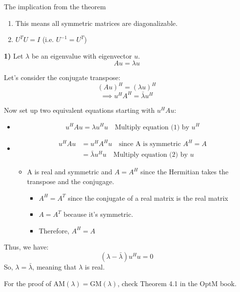 \begin{warning}
    The implication from the theorem
    \begin{enumerate}
        \item This means all symmetric matrices are diagonalizable. 
        \item $U^T U = I$ (i.e. $U^{-1} = U^T$)
    \end{enumerate}
\end{warning}

\begin{derivation}
        \textbf{1)} Let $\lambda$ be an eigenvalue with eigenvector $u$.
        \[
        A u = \lambda u \tag{1}
        \]
        
        Let's consider the conjugate transpose:
        \[
        (A u)^H = (\lambda u)^H
        \]
        \[
        \implies u^H A^H = \bar{\lambda} u^H \tag{2}
        \]
        \vspace{1em}

        Now set up two equivalent equations starting with $u^H A u$:
        
        \begin{itemize}
            \item
            \[
            u^H A u = \lambda u^H u \quad \text{Multiply equation (1) by $u^H$}
            \]
            \item 
            \begin{align*}
                u^H A u &= u^H A^H u \quad \text{since A is symmetric } A^H = A\\
                &= \bar{\lambda} u^H u \quad \text{Multiply equation (2) by $u$}
            \end{align*}
            \begin{itemize}
                \item A is real and symmetric and $A = A^H$ since the Hermitian takes the transpose and the conjugage. 
                \begin{itemize}
                    \item $A^H = A^T$ since the conjugate of a real matrix is the real matrix 
                    \item $A=A^T$ because it's symmetric. 
                    \item Therefore, $A^H = A$
                \end{itemize}
            \end{itemize}
        \end{itemize}
        \vspace{1em}

        Thus, we have:
        \[
        (\lambda - \bar{\lambda}) u^H u = 0
        \]
        So, $\lambda = \bar{\lambda}$, meaning that $\lambda$ is real.
        \vspace{1em}

        For the proof of $\text{AM}(\lambda) = \text{GM}(\lambda)$, check Theorem 4.1 in the OptM book.
\end{derivation}

